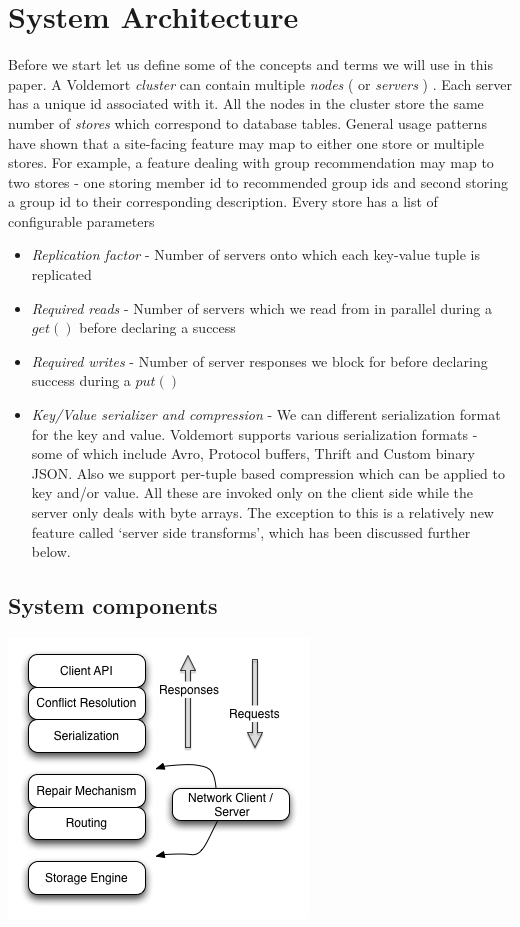 \documentclass[10pt,twocolumn,preprint,natbib,authoryear]{sigplanconf}
\begin{document}
\section{System Architecture}

Before we start let us define some of the concepts and terms we will use in this paper. A Voldemort \emph{cluster} can contain multiple \emph{nodes} ( or \emph{servers} ) . Each server has a unique id associated with it. All the nodes in the cluster store the same number of \emph{stores} which correspond to database tables. General usage patterns have shown that a site-facing feature may map to either one store or multiple stores. For example, a feature dealing with group recommendation may map to two stores - one storing member id to recommended group ids and second storing a group id to their corresponding description. Every store has a list of configurable parameters

\begin{itemize}
	\item \emph {Replication factor} - Number of servers onto which each key-value tuple is replicated 
	\item \emph {Required reads} - Number of servers which we read from in parallel during a $get()$ before declaring a success
	\item \emph {Required writes} - Number of server responses we block for before declaring success during a $put()$
	\item \emph {Key/Value serializer and compression} - We can different serialization format for the key and value. Voldemort supports various serialization formats - some of which include Avro, Protocol buffers, Thrift and Custom binary JSON. Also we support per-tuple based compression which can be applied to key and/or value. All these are invoked only on the client side while the server only deals with byte arrays. The exception to this is a relatively new feature called `server side transforms', which has been discussed further below. 
\end{itemize}

\subsection{System components}
  
\begin{center}
\includegraphics[scale=0.65]{arch.png}
\end{center}
\end{document}
